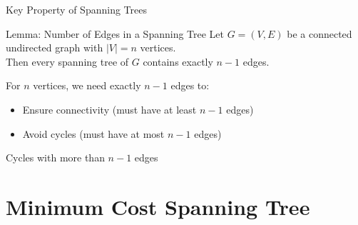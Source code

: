 \documentclass{beamer}
\begin{document}
\begin{frame}{Key Property of Spanning Trees}
\begin{block}{Lemma: Number of Edges in a Spanning Tree}
Let $G = (V, E)$ be a connected undirected graph with $|V| = n$ vertices. \\
Then every spanning tree of $G$ contains exactly $n - 1$ edges.
\end{block}

\begin{center}
\end{center}

For $n$ vertices, we need exactly $n-1$ edges to:
\begin{itemize}
\item Ensure connectivity (must have at least $n-1$ edges)
\item Avoid cycles (must have at most $n-1$ edges)
\end{itemize}
\end{frame}
\begin{frame}{Cycles with more than $n-1$ edges}

\end{frame}

\section{Minimum Cost Spanning Tree}
\end{document}
